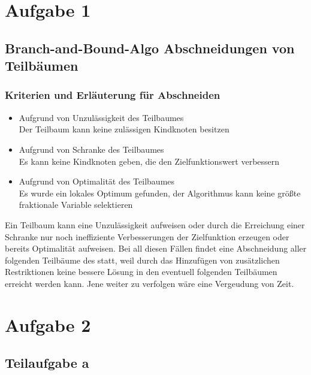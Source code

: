 \documentclass[a4paper,11pt]{article}
\begin{document}
\raggedright %

\section*{Aufgabe 1}

\subsection*{Branch-and-Bound-Algo Abschneidungen von Teilbäumen} 
\subsubsection*{Kriterien und Erläuterung für Abschneiden}
    \begin{itemize}
        \item {Aufgrund von Unzulässigkeit des Teilbaumes \\
                Der Teilbaum kann keine zulässigen Kindknoten besitzen
            }
        \item {Aufgrund von Schranke des Teilbaumes \\
                Es kann keine Kindknoten geben, die den Zielfunktionswert verbessern
            }
        \item {Aufgrund von Optimalität des Teilbaumes \\
                Es wurde ein lokales Optimum gefunden, der Algorithmus kann keine größte fraktionale Variable selektieren
            }
    \end{itemize}
    Ein Teilbaum kann eine Unzulässigkeit aufweisen oder durch die Erreichung einer Schranke nur noch ineffiziente Verbesserungen der Zielfunktion erzeugen oder bereits Optimalität aufweisen. Bei all diesen Fällen findet eine Abschneidung aller folgenden Teilbäume des statt, weil durch das Hinzufügen von zusätzlichen Restriktionen keine bessere Lösung in den eventuell folgenden Teilbäumen erreicht werden kann. Jene weiter zu verfolgen wäre eine Vergeudung von Zeit.
\bigbreak

\section*{Aufgabe 2}

\subsection*{Teilaufgabe a}
\end{document}
